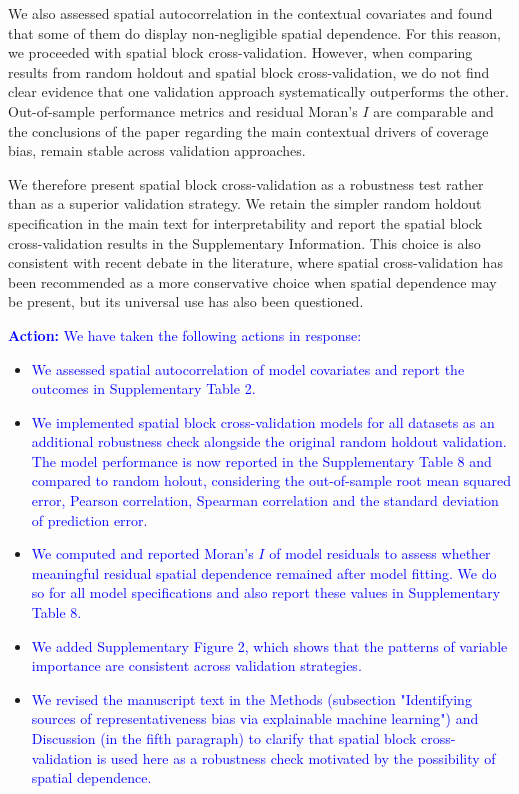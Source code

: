 \documentclass[
  letterpaper,
  DIV=11,
  numbers=noendperiod]{scrartcl}
\begin{document}
We also assessed spatial autocorrelation in the contextual covariates
and found that some of them do display non-negligible spatial
dependence. For this reason, we proceeded with spatial block
cross-validation. However, when comparing results from random holdout
and spatial block cross-validation, we do not find clear evidence that
one validation approach systematically outperforms the other.
Out-of-sample performance metrics and residual Moran's \(I\) are
comparable and the conclusions of the paper regarding the main
contextual drivers of coverage bias, remain stable across validation
approaches.

We therefore present spatial block cross-validation as a robustness test
rather than as a superior validation strategy. We retain the simpler
random holdout specification in the main text for interpretability and
report the spatial block cross-validation results in the Supplementary
Information. This choice is also consistent with recent debate in the
literature, where spatial cross-validation has been recommended as a
more conservative choice when spatial dependence may be present, but its
universal use has also been questioned.

\setlength{\leftskip}{0.5cm}\textcolor{blue}{\textbf{Action:} We have taken the following actions in response:}
\vspace{-3mm}

\begin{itemize}[noitemsep, topsep=0pt]
\item \textcolor{blue}{We assessed spatial autocorrelation of model covariates and report the outcomes in Supplementary Table 2.}
\item \textcolor{blue}{We implemented spatial block cross-validation models for all datasets as an additional robustness check alongside the original random holdout validation. The model performance is now reported in the Supplementary Table 8 and compared to random holout, considering the out-of-sample root mean squared error, Pearson correlation, Spearman correlation and the standard deviation of prediction error.}
\item \textcolor{blue}{We computed and reported Moran’s $I$ of model residuals to assess whether meaningful residual spatial dependence remained after model fitting. We do so for all model specifications and also report these values in Supplementary Table 8.}
\item \textcolor{blue}{We added Supplementary Figure 2, which shows that the patterns of variable importance are consistent across validation strategies.}
\item \textcolor{blue}{We revised the manuscript text in the Methods (subsection "Identifying sources of representativeness bias via explainable machine learning") and Discussion (in the fifth paragraph) to clarify that spatial block cross-validation is used here as a robustness check motivated by the possibility of spatial dependence.}
\end{itemize}
\end{document}
